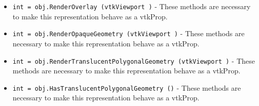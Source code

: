 \begin{itemize}
\item  \verb|int = obj.RenderOverlay (vtkViewport )| -  These methods are necessary to make this representation behave as
 a vtkProp.

\item  \verb|int = obj.RenderOpaqueGeometry (vtkViewport )| -  These methods are necessary to make this representation behave as
 a vtkProp.

\item  \verb|int = obj.RenderTranslucentPolygonalGeometry (vtkViewport )| -  These methods are necessary to make this representation behave as
 a vtkProp.

\item  \verb|int = obj.HasTranslucentPolygonalGeometry ()| -  These methods are necessary to make this representation behave as
 a vtkProp.

\end{itemize}
